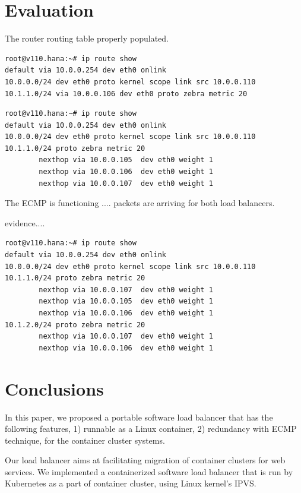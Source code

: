 \section{Evaluation}\label{Evaluation}


The router routing table properly populated.

\begin{verbatim}
root@v110.hana:~# ip route show
default via 10.0.0.254 dev eth0 onlink
10.0.0.0/24 dev eth0 proto kernel scope link src 10.0.0.110
10.1.1.0/24 via 10.0.0.106 dev eth0 proto zebra metric 20
\end{verbatim}

\begin{verbatim}
root@v110.hana:~# ip route show
default via 10.0.0.254 dev eth0 onlink
10.0.0.0/24 dev eth0 proto kernel scope link src 10.0.0.110
10.1.1.0/24 proto zebra metric 20
        nexthop via 10.0.0.105  dev eth0 weight 1
        nexthop via 10.0.0.106  dev eth0 weight 1
        nexthop via 10.0.0.107  dev eth0 weight 1
\end{verbatim}

The ECMP is functioning .... packets are arriving for both load balancers.

evidence....

\begin{verbatim}
root@v110.hana:~# ip route show
default via 10.0.0.254 dev eth0 onlink
10.0.0.0/24 dev eth0 proto kernel scope link src 10.0.0.110
10.1.1.0/24 proto zebra metric 20
        nexthop via 10.0.0.107  dev eth0 weight 1
        nexthop via 10.0.0.105  dev eth0 weight 1
        nexthop via 10.0.0.106  dev eth0 weight 1
10.1.2.0/24 proto zebra metric 20
        nexthop via 10.0.0.107  dev eth0 weight 1
        nexthop via 10.0.0.106  dev eth0 weight 1
\end{verbatim}



\section{Conclusions}\label{Conclusions}

In this paper, we proposed a portable software load balancer that has the following features, 1) runnable as a Linux container, 2) redundancy with ECMP technique,  for the container cluster systems.

Our load balancer aims at facilitating migration of container clusters for web services.
We implemented a containerized software load balancer that is run by Kubernetes as a part of container cluster,
using Linux kernel's IPVS.

